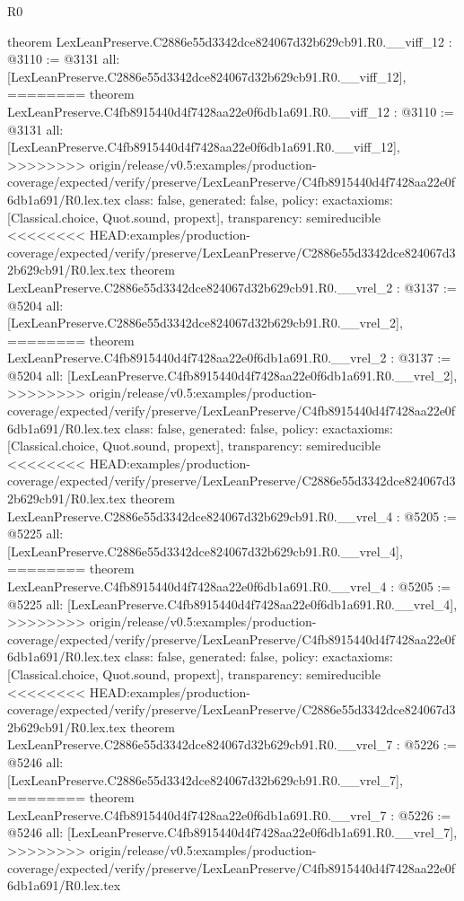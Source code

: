 \begin{lexlean}{R0}
\begin{coremodule}
{{{{{{{{{{{{{{{{{{{{{{{{{{{{{{{{{{{{{{{{{{{{{{{{{{{{{{{{{{{{{{{{{{theorem LexLeanPreserve.C2886e55d3342dce824067d32b629cb91.R0.__viff_12 : @3110 := @3131 {
  all: [LexLeanPreserve.C2886e55d3342dce824067d32b629cb91.R0.__viff_12],
========
theorem LexLeanPreserve.C4fb8915440d4f7428aa22e0f6db1a691.R0.__viff_12 : @3110 := @3131 {
  all: [LexLeanPreserve.C4fb8915440d4f7428aa22e0f6db1a691.R0.__viff_12],
>>>>>>>> origin/release/v0.5:examples/production-coverage/expected/verify/preserve/LexLeanPreserve/C4fb8915440d4f7428aa22e0f6db1a691/R0.lex.tex
  class: false,
  generated: false,
  policy: exact{axioms: [Classical.choice, Quot.sound, propext]},
  transparency: semireducible
}
<<<<<<<< HEAD:examples/production-coverage/expected/verify/preserve/LexLeanPreserve/C2886e55d3342dce824067d32b629cb91/R0.lex.tex
theorem LexLeanPreserve.C2886e55d3342dce824067d32b629cb91.R0.__vrel_2 : @3137 := @5204 {
  all: [LexLeanPreserve.C2886e55d3342dce824067d32b629cb91.R0.__vrel_2],
========
theorem LexLeanPreserve.C4fb8915440d4f7428aa22e0f6db1a691.R0.__vrel_2 : @3137 := @5204 {
  all: [LexLeanPreserve.C4fb8915440d4f7428aa22e0f6db1a691.R0.__vrel_2],
>>>>>>>> origin/release/v0.5:examples/production-coverage/expected/verify/preserve/LexLeanPreserve/C4fb8915440d4f7428aa22e0f6db1a691/R0.lex.tex
  class: false,
  generated: false,
  policy: exact{axioms: [Classical.choice, Quot.sound, propext]},
  transparency: semireducible
}
<<<<<<<< HEAD:examples/production-coverage/expected/verify/preserve/LexLeanPreserve/C2886e55d3342dce824067d32b629cb91/R0.lex.tex
theorem LexLeanPreserve.C2886e55d3342dce824067d32b629cb91.R0.__vrel_4 : @5205 := @5225 {
  all: [LexLeanPreserve.C2886e55d3342dce824067d32b629cb91.R0.__vrel_4],
========
theorem LexLeanPreserve.C4fb8915440d4f7428aa22e0f6db1a691.R0.__vrel_4 : @5205 := @5225 {
  all: [LexLeanPreserve.C4fb8915440d4f7428aa22e0f6db1a691.R0.__vrel_4],
>>>>>>>> origin/release/v0.5:examples/production-coverage/expected/verify/preserve/LexLeanPreserve/C4fb8915440d4f7428aa22e0f6db1a691/R0.lex.tex
  class: false,
  generated: false,
  policy: exact{axioms: [Classical.choice, Quot.sound, propext]},
  transparency: semireducible
}
<<<<<<<< HEAD:examples/production-coverage/expected/verify/preserve/LexLeanPreserve/C2886e55d3342dce824067d32b629cb91/R0.lex.tex
theorem LexLeanPreserve.C2886e55d3342dce824067d32b629cb91.R0.__vrel_7 : @5226 := @5246 {
  all: [LexLeanPreserve.C2886e55d3342dce824067d32b629cb91.R0.__vrel_7],
========
theorem LexLeanPreserve.C4fb8915440d4f7428aa22e0f6db1a691.R0.__vrel_7 : @5226 := @5246 {
  all: [LexLeanPreserve.C4fb8915440d4f7428aa22e0f6db1a691.R0.__vrel_7],
>>>>>>>> origin/release/v0.5:examples/production-coverage/expected/verify/preserve/LexLeanPreserve/C4fb8915440d4f7428aa22e0f6db1a691/R0.lex.tex
}}}}}}}}}}}}}}}}}}}}}}}}}}}}}}}}}}}}}}}}}}}}}}}}}}}}}}}}}}}}}}}}}}}}}}}
\end{coremodule}
\end{lexlean}
